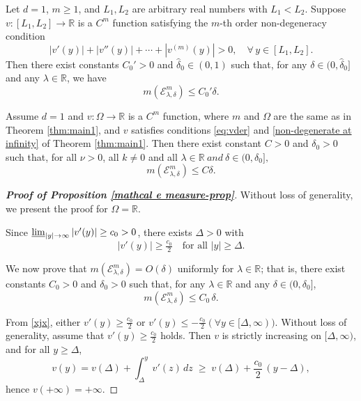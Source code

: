\documentclass[10pt,a4paper]{amsart}
\begin{document}
{\begin{lemma}\label{mathcal{E}(lambda)}
Let $d=1$, $m \geq 1$, and $L_1, L_2$ are arbitrary real numbers with $L_1 < L_2$. Suppose $v:[L_1,L_2] \to \mathbb{R}$ is a $C^m$ function satisfying the $m$-th order non-degeneracy condition
\[
 |v'(y)| + |v''(y)| + \cdots + |v^{(m)}(y)| > 0,\quad \forall\, y \in [L_1,L_2].
\]
Then there exist constants $C_0' > 0$ and $\hat{\delta}_0 \in (0,1)$ such that, 
for any $\delta \in (0,\hat{\delta}_0]$ and any $\lambda \in \mathbb{R}$, we have
\[
 m(\mathcal{E}^m_{\lambda,\delta})\leq C_0' \delta .
\]
\end{lemma}

\begin{proposition}\label{mathcal e measure-prop}
Assume $d=1$ and $v : \Omega\to \mathbb{R}$ is a $C^{m}$ function, where $m$ and $\Omega$ are the same as in Theorem \ref{thm:main1}, and $v$ satisfies conditions \eqref{eq:vder} and \eqref{non-degenerate at infinity} of Theorem \ref{thm:main1}. Then
there exist constant $C > 0$ and  $\delta_0>0$ such that, for all $\nu > 0$, all $k \neq 0$ and all $\lambda\in\mathbb{R}\ and\ \delta\in(0,\delta_0],$ 
\begin{equation}\label{mathcal e measure}
m(\mathcal{E}_{\lambda,\delta}^m) \leq C\delta.
\end{equation}
\end{proposition}

\begin{proof}[\bf Proof of Proposition \ref{mathcal e measure-prop}]
Without loss of generality, we present the proof for $\Omega=\mathbb{R}$.

Since $\varliminf_{|y|\to\infty}|v'(y)|\ge c_0>0$, there exists $\Delta>0$ with
\begin{equation}\label{xjx}
  |v'(y)| \ge \tfrac{c_0}{2} \quad \text{for all } |y|\ge \Delta.
\end{equation}

We now prove that $m(\mathcal{E}^{m}_{\lambda,\delta}) = O(\delta)$ uniformly for $\lambda\in\mathbb{R}$; that is, there exist constants $C_0>0$ and $\delta_0>0$ such that, for any $\lambda\in\mathbb{R}$ and any $\delta\in(0,\delta_0]$,
\[
  m(\mathcal{E}^{m}_{\lambda,\delta}) \le C_0\,\delta.
\]

From \eqref{xjx}, either $ v'(y)\ge \tfrac{c_0}{2} \text{ or } v'(y)\le -\tfrac{c_0}{2} (\forall y\in[\Delta,\infty))$. Without loss of generality, assume that $v'(y)\ge \tfrac{c_0}{2}$ holds. Then $v$ is strictly increasing on $[\Delta,\infty)$, and for all $y\ge \Delta$,
\[
  v(y)=v(\Delta)+\int_{\Delta}^{y} v'(z)\,dz
  \;\ge\; v(\Delta)+\frac{c_0}{2}\,(y-\Delta),
\]
hence $v(+\infty)=+\infty$.


\end{proof}}
\end{document}
